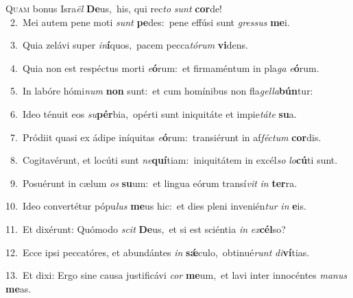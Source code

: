 \lettrine{\initial\textcolor{\initialcolor}{Q}}{uam} bonus Isra\textit{ël} \textbf{De}\-us,~\star his, qui rec\textit{to} \textit{sunt} \textbf{cor}\-de!\\
{\numbfont\textcolor{\numbcolor}{~2.}}~Mei autem pene moti \textit{sunt} \textbf{pe}\-des:~\star pene effúsi sunt \textit{gres}\-\textit{sus} \textbf{me}\-i.\par
{\numbfont\textcolor{\numbcolor}{~3.}}~Quia zelávi super \textit{in}\-\textbf{í}quos,~\star pacem pecca\-\textit{tó}\-\textit{rum} \textbf{vi}\-dens.\par
{\numbfont\textcolor{\numbcolor}{~4.}}~Quia non est respéctus morti \textit{e}\-\textbf{ó}rum:~\star et firmaméntum in pla\textit{ga} \textit{e}\-\textbf{ó}rum.\par
{\numbfont\textcolor{\numbcolor}{~5.}}~In labóre hómi\textit{num} \textbf{non} sunt:~\star et cum homínibus non fla\-\textit{gel}\-\textit{la}\textbf{bún}tur:\par
{\numbfont\textcolor{\numbcolor}{~6.}}~Ideo ténuit eos \textit{su}\-\textbf{pér}bia,~\star opérti sunt iniquitáte et impie\-\textit{tá}\-\textit{te} \textbf{su}\-a.\par
{\numbfont\textcolor{\numbcolor}{~7.}}~Pródiit quasi ex ádipe iníquitas \textit{e}\-\textbf{ó}rum:~\star transiérunt in af\-\textit{féc}\-\textit{tum} \textbf{cor}\-dis.\par
{\numbfont\textcolor{\numbcolor}{~8.}}~Cogitavérunt, et locúti sunt \textit{ne}\-\textbf{quí}tiam:~\star iniquitátem in excél\textit{so} \textit{lo}\-\textbf{cú}ti sunt.\par
{\numbfont\textcolor{\numbcolor}{~9.}}~Posuérunt in cælum \textit{os} \textbf{su}\-um:~\star et lingua eórum transí\textit{vit} \textit{in} \textbf{ter}\-ra.\par
{\numbfont\textcolor{\numbcolor}{10.}}~Ideo convertétur pópu\textit{lus} \textbf{me}\-us hic:~\star et dies pleni invenién\textit{tur} \textit{in} \textbf{e}\-is.\par
{\numbfont\textcolor{\numbcolor}{11.}}~Et dixérunt: Quómodo \textit{scit} \textbf{De}\-us,~\star et si est sciéntia \textit{in} \textit{ex}\-\textbf{cél}so?\par
{\numbfont\textcolor{\numbcolor}{12.}}~Ecce ipsi peccatóres, et abundántes \textit{in} \textbf{sǽ}\-culo,~\star obtinué\textit{runt} \textit{di}\-\textbf{ví}tias.\par
{\numbfont\textcolor{\numbcolor}{13.}}~Et dixi: Ergo sine causa justificávi \textit{cor} \textbf{me}\-um,~\star et lavi inter innocéntes \textit{ma}\-\textit{nus} \textbf{me}\-as.\par
